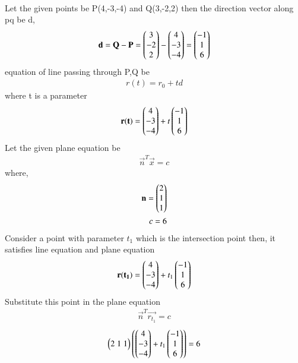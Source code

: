\documentclass[journal]{IEEEtran}
\begin{document}
         \solution \\
         Let the given points be P(4,-3,-4) and Q(3,-2,2) then the direction vector along pq be d, 
         \begin{align}
             \mathbf{d}=\mathbf{Q}-\mathbf{P}=\begin{pmatrix}3\\-2\\2\end{pmatrix}-\begin{pmatrix}4\\-3\\-4\end{pmatrix}=\begin{pmatrix}-1\\1\\6\end{pmatrix}
         \end{align}
         equation of line passing through P,Q be
         \begin{align}
             r(t)=r_0+td
         \end{align}
         where t is a parameter
         \begin{align}
             \mathbf{r(t)}=\begin{pmatrix}4\\-3\\-4\end{pmatrix}+t\begin{pmatrix}-1\\1\\6\end{pmatrix}
         \end{align}
         Let the given plane equation be 
         \begin{align}
             \vec{n}^T\vec{x}=c 
         \end{align}
         where, 
         \begin{align}
             \mathbf{n}=\begin{pmatrix}2\\1\\1\end{pmatrix}\\
             c=6
         \end{align}
         Consider a point with parameter $t_1$ which is the intersection point then, it satisfies line equation and plane equation 
         \begin{align}
             \mathbf{r(t_1)}=\begin{pmatrix}4\\-3\\-4\end{pmatrix}+t_1\begin{pmatrix}-1\\1\\6\end{pmatrix}
         \end{align}
         Substitute this point in the plane equation 
         \begin{align}
             \vec{n}^T\vec{r_{t_1}}=c
         \end{align}
         \begin{align}
             \begin{pmatrix}2\;1\;1\end{pmatrix}\left(\begin{pmatrix}4\\-3\\-4\end{pmatrix}+t_1\begin{pmatrix}-1\\1\\6\end{pmatrix}\right)=6
         \end{align}
\end{document}
